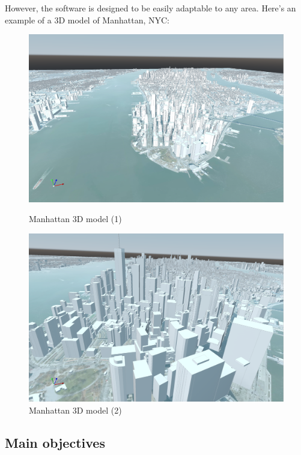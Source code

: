 \documentclass[12pt]{article}
\begin{document}
However, the software is designed to be easily adaptable to any area.
Here's an example of a 3D model of Manhattan, NYC:

\begin{figure}[H]
    \centering
    \begin{minipage}{0.45\textwidth}
      \centering
      \includegraphics[width=1\textwidth]{images/manhattan-mesh-1.png}
      \caption{Manhattan 3D model (1)}
    \end{minipage}
    \begin{minipage}{0.45\textwidth}
      \centering
      \includegraphics[width=1\textwidth]{images/manhattan-mesh-2.png}
      \caption{Manhattan 3D model (2)}
    \end{minipage}
\end{figure}

\subsection{Main objectives}
\end{document}
